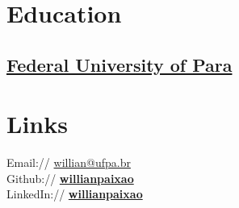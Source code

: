 \documentclass[]{willianpaixao-resume}
\begin{document}
\lastupdated



\begin{minipage}[t]{0.34\textwidth}

\section{Education}

\subsection{\href{http://www.portal.ufpa.br/}{Federal University of Para}}
\sectionsep


\section{Links}
Email:// \href{mailto:willian@ufpa.br}{willian@ufpa.br}\\
Github:// \href{https://github.com/willianpaixao}{\bf willianpaixao} \\
LinkedIn:// \href{https://www.linkedin.com/in/willianpaixao}{\bf willianpaixao} \\
\sectionsep




\end{minipage}
\end{document}
